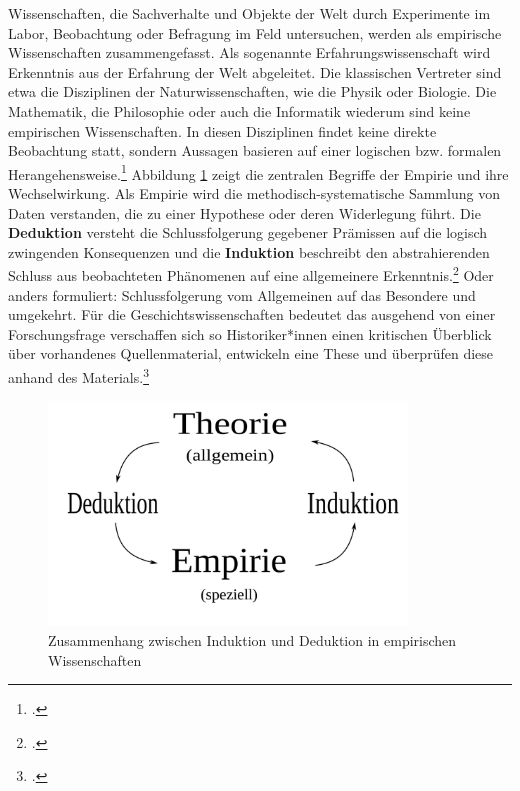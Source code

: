 \documentclass[12pt,a4paper]{article}
\begin{document}
Wissenschaften, die Sachverhalte und Objekte der Welt durch Experimente im Labor, Beobachtung oder Befragung im Feld untersuchen, werden als empirische Wissenschaften zusammengefasst. Als sogenannte Erfahrungswissenschaft wird Erkenntnis aus der Erfahrung der Welt abgeleitet. Die klassischen Vertreter sind etwa die Disziplinen der Naturwissenschaften, wie die Physik oder Biologie. Die Mathematik, die Philosophie oder auch die Informatik wiederum sind keine empirischen Wissenschaften. In diesen Disziplinen findet keine direkte Beobachtung statt, sondern Aussagen basieren auf einer logischen bzw. formalen Herangehensweise.\footcite[08.11.2019]{frommergrundbegriffe} Abbildung \ref{fig:empirismus} zeigt die zentralen Begriffe der Empirie und ihre Wechselwirkung. Als Empirie wird die methodisch-systematische Sammlung von Daten verstanden, die zu einer Hypothese oder deren Widerlegung führt. Die \textbf{Deduktion} versteht die Schlussfolgerung gegebener Prämissen auf die logisch zwingenden Konsequenzen und die \textbf{Induktion} beschreibt den abstrahierenden Schluss aus beobachteten Phänomenen auf eine allgemeinere Erkenntnis.\footcite[Siehe][]{chalmers2007wege}
Oder anders formuliert: Schlussfolgerung vom Allgemeinen auf das Besondere und umgekehrt. Für die Geschichtswissenschaften bedeutet das ausgehend von einer Forschungsfrage verschaffen sich so Historiker*innen einen kritischen Überblick über  vorhandenes Quellenmaterial, entwickeln eine These und überprüfen diese anhand des Materials.\footcite[][S.45-46]{jordan2018theorien}
\begin{figure}[H]
\centering
	\includegraphics[width=0.85\textwidth]{img/emprisimus.png}  
    \caption[Zusammenhang zwischen Induktion und Deduktion in empirischen Wissenschaften, \protect\url{de.wikipedia.org/wiki/Empirie}, 09.11.2019.]{Zusammenhang zwischen Induktion und Deduktion in empirischen Wissenschaften} \label{fig:empirismus}
\end{figure}
\end{document}
